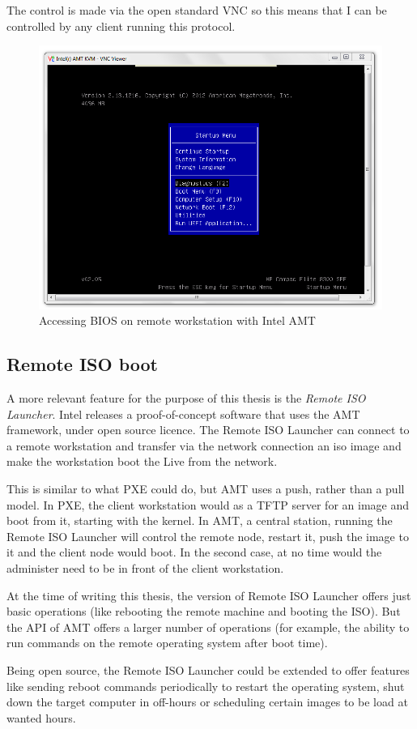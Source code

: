 The control is made via the open standard \ac{VNC} so this means that I
can be controlled by any client running this protocol.

\begin{figure}[ht]
\begin{center}
\includegraphics[scale=0.5]{img/intel_amt_bios}
\end{center}
\caption{Accessing BIOS on remote workstation with Intel AMT}
\label{fig1}
\end{figure}


\subsection{Remote ISO boot}


A more relevant feature for the purpose of this thesis is the
\emph{Remote ISO Launcher}. Intel releases a proof-of-concept software
that uses the \ac{AMT} framework, under open source licence. The Remote
ISO Launcher can connect to a remote workstation and transfer via the
network connection an iso image and make the workstation boot the Live
from the network.

This is similar to what \ac{PXE} could do, but \ac{AMT} uses a push,
rather than a pull model. In PXE, the client workstation would as a
\ac{TFTP} server for an image  and boot from it, starting with the
kernel. In AMT, a central station, running the Remote ISO Launcher will
control the remote node, restart it, push the image to it and the client
node would boot. In the second case, at no time would the administer
need to be in front of the client workstation.

At the time of writing this thesis, the version of Remote ISO Launcher
offers just basic operations (like rebooting the remote machine and
booting the ISO). But the API of AMT offers a larger number of
operations (for example, the ability to run commands on the remote
operating system after boot time).

Being open source, the Remote ISO Launcher could be extended to offer
features like sending reboot commands periodically to restart the
operating system, shut down the target computer in off-hours or
scheduling certain images to be load at wanted hours.


